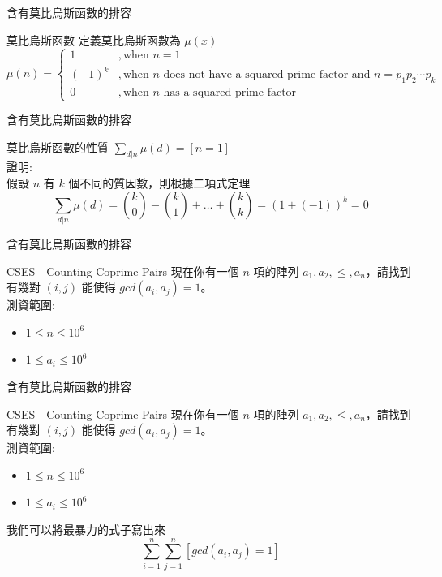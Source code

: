 \documentclass[aspectratio=169]{beamer}
\begin{document}
\begin{frame}{含有莫比烏斯函數的排容}
    \begin{alertblock}{莫比烏斯函數}
        定義莫比烏斯函數為 $\mu(x)$
        $$\mu(n) = \begin{cases} 1&, \text{when } n = 1\\(-1)^k &,\text{when } n \text{ does not have a squared prime factor and } n = p_1p_2\cdots p_k \\ 0 & ,\text{when } n \text{ has a squared prime factor}\end{cases}$$
    \end{alertblock}
\end{frame}

\begin{frame}{含有莫比烏斯函數的排容}
    \begin{alertblock}{莫比烏斯函數的性質}
        $\displaystyle \sum_{d|n} \mu(d) = [n=1]$ \\
        證明: \\
        假設 $n$ 有 $k$ 個不同的質因數，則根據二項式定理
        $$\sum_{d|n} \mu(d) = \binom{k}{0} - \binom{k}{1} + \dots + \binom{k}{k} = (1+(-1))^k = 0$$
    \end{alertblock}
\end{frame}

\begin{frame}{含有莫比烏斯函數的排容}
    \begin{block}{CSES - Counting Coprime Pairs}
        現在你有一個 $n$ 項的陣列 $a_1, a_2, \le, a_n$，請找到有幾對 $(i,j)$ 能使得 $gcd(a_i,a_j)=1$。 \\
        \vspace{5mm}
        測資範圍:
        \begin{itemize}
            \item $1 \le n \le 10^6$
            \item $1 \le a_i \le 10^6$
        \end{itemize}
    \end{block}
\end{frame}

\begin{frame}{含有莫比烏斯函數的排容}
    \begin{block}{CSES - Counting Coprime Pairs}
        現在你有一個 $n$ 項的陣列 $a_1, a_2, \le, a_n$，請找到有幾對 $(i,j)$ 能使得 $gcd(a_i,a_j)=1$。 \\
        \vspace{5mm}
        測資範圍:
        \begin{itemize}
            \item $1 \le n \le 10^6$
            \item $1 \le a_i \le 10^6$
        \end{itemize}
    \end{block}
    我們可以將最暴力的式子寫出來
    $$\sum_{i=1}^n \sum_{j=1}^n [gcd(a_i,a_j)=1]$$
\end{frame}
\end{document}
